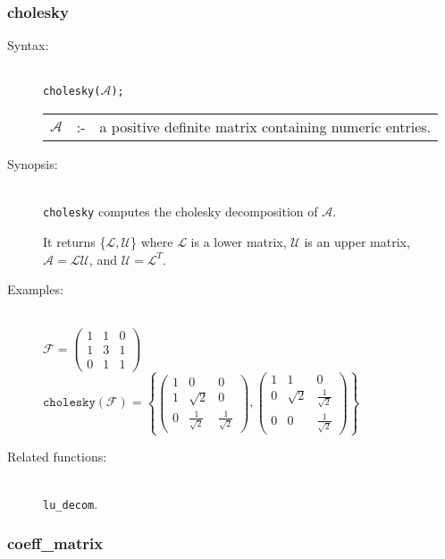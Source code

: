 \subsubsection{cholesky}
\label{linalg:cholesky}

\begin{description}
\item[Syntax:]\mbox{}\\
\texttt{cholesky($\mathcal{A}$);}\\[2mm]
\begin{tabular}{l l l}
$\mathcal{A}$ &:-& a positive definite matrix containing numeric entries.
\end{tabular}

\item[Synopsis:]\mbox{}\\
\texttt{cholesky} computes the cholesky decomposition of $\mathcal{A}$.

It returns \{$\mathcal{L},\mathcal{U}$\} where $\mathcal{L}$
is a lower matrix, $\mathcal{U}$ is an upper matrix, \\ $\mathcal{A} =
\mathcal{LU}$, and $\mathcal{U} = \mathcal{L}^T$.

\item[Examples:]\mbox{}\\
  \(\mathcal{F} = \begin{pmatrix} 1 & 1 & 0 \\ 1 & 3 & 1 \\ 0 & 1 & 1 \end{pmatrix}\) \\[2mm]
  \(\texttt{cholesky}(\mathcal{F})  =
  \left\{ \begin{pmatrix} 1 & 0 & 0 \\ 1 & \sqrt{2} & 0 \\
    0 & \frac{1}{\sqrt{2}} & \frac{1}{\sqrt{2}} \end{pmatrix},
  \begin{pmatrix} 1 & 1 & 0 \\ 0 & \sqrt{2} & \frac{1}{\sqrt{2}} \\ 0
    & 0 & \frac{1}{\sqrt{2}} \end{pmatrix}
  \right\}\)

\item[Related functions:]\mbox{}\\
\texttt{lu\_decom}.
\end{description}


\subsubsection{coeff\_matrix}
\label{linalg:coeff_matrix}

